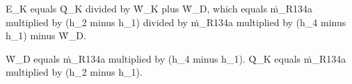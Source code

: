 E_K equals Q̇_K divided by Ẇ_K plus Ẇ_D, which equals ṁ_R134a multiplied by (h_2 minus h_1) divided by ṁ_R134a multiplied by (h_4 minus h_1) minus Ẇ_D.  

Ẇ_D equals ṁ_R134a multiplied by (h_4 minus h_1).  
Q̇_K equals ṁ_R134a multiplied by (h_2 minus h_1).